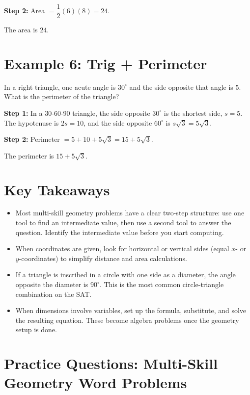 \documentclass[14pt]{extarticle}
\begin{document}
\textbf{Step 2:} Area \(= \dfrac{1}{2}(6)(8) = 24\).

The area is \(\boxed{24}\).

\section*{Example 6: Trig + Perimeter}

In a right triangle, one acute angle is \(30^\circ\) and the side opposite that angle is 5. What is the perimeter of the triangle?

\textbf{Step 1:} In a 30-60-90 triangle, the side opposite \(30^\circ\) is the shortest side, \(s = 5\). The hypotenuse is \(2s = 10\), and the side opposite \(60^\circ\) is \(s\sqrt{3} = 5\sqrt{3}\).

\textbf{Step 2:} Perimeter \(= 5 + 10 + 5\sqrt{3} = 15 + 5\sqrt{3}\).

The perimeter is \(\boxed{15 + 5\sqrt{3}}\).

\section*{Key Takeaways}
\begin{itemize}
  \item Most multi-skill geometry problems have a clear two-step structure: use one tool to find an intermediate value, then use a second tool to answer the question. Identify the intermediate value before you start computing.
  \item When coordinates are given, look for horizontal or vertical sides (equal \(x\)- or \(y\)-coordinates) to simplify distance and area calculations.
  \item If a triangle is inscribed in a circle with one side as a diameter, the angle opposite the diameter is \(90^\circ\). This is the most common circle-triangle combination on the SAT.
  \item When dimensions involve variables, set up the formula, substitute, and solve the resulting equation. These become algebra problems once the geometry setup is done.
\end{itemize}

\newpage

\section*{Practice Questions: Multi-Skill Geometry Word Problems}
\end{document}
